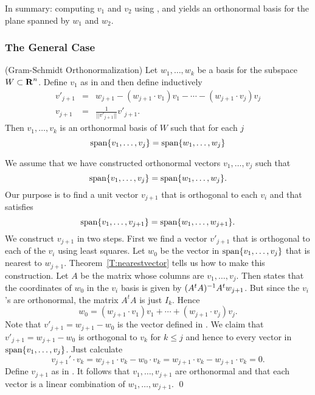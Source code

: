 In summary: computing $v_1$ and $v_2$ using , 
and  yields an orthonormal basis for the
plane spanned by $w_1$ and $w_2$.

\subsubsection*{The General Case}

\begin{thm} (Gram-Schmidt Orthonormalization) \label{T:orthobasis}
Let $w_1,\ldots,w_k$ be a basis for the subspace $W\subset\mbox{$\bf{R}$}^n$.  Define
$v_1$ as in  and then define inductively
\begin{eqnarray}
v'_{j+1} & = & w_{j+1} -(w_{j+1}\cdot v_1)v_1- \cdots -(w_{j+1}\cdot v_j)v_j
\label{E:inductiveGS} \\
v_{j+1} & = & \frac{1}{||v'_{j+1}||}v'_{j+1}. \label{eq:gsnormal}
\end{eqnarray}
Then $v_1,\ldots,v_k$ is an orthonormal basis of $W$ such that for each $j$
\[
{\rm span}\{v_1,\ldots,v_j\} = {\rm span}\{w_1,\ldots,w_j\}
\]
\end{thm}

\proof  We assume that we have constructed orthonormal vectors $v_1,\ldots,v_j$
such that
\[
{\rm span}\{v_1,\ldots,v_j\} = {\rm span}\{w_1,\ldots,w_j\}.
\]
Our purpose is to find a unit vector $v_{j+1}$ that is orthogonal to each $v_i$
and that satisfies
\[
{\rm span}\{v_1,\ldots,v_{j+1}\} = {\rm span}\{w_1,\ldots,w_{j+1}\}.
\]
We construct $v_{j+1}$ in two steps.  First we find a vector $v'_{j+1}$
that is orthogonal to each of the $v_i$ using least squares.  Let $w_0$
be the vector in ${\rm span}\{v_1,\ldots,v_j\}$ that is nearest to $w_{j+1}$.
Theorem~\ref{T:nearestvector} tells us how to make this construction.
Let $A$ be the matrix whose columns are $v_1,\ldots,v_j$.  Then
 states that the coordinates of $w_0$ in the $v_i$ basis
is given by $(A^tA)^{-1} A^tw_{j+1}$. But since the $v_i$'s are orthonormal,
the matrix $A^tA$ is just $I_k$.  Hence
\[
w_0 =  (w_{j+1}\cdot v_1)v_1 + \cdots + (w_{j+1}\cdot v_j)v_j.
\]
Note that $v'_{j+1}=w_{j+1}-w_0$ is the vector defined in .
We claim that $v'_{j+1}=w_{j+1}-w_0$ is orthogonal to $v_k$ for $k\leq j$
and hence to every vector in ${\rm span}\{v_1,\ldots,v_j\}$.  Just calculate
\[
v_{j+1}'\cdot v_k = w_{j+1}\cdot v_k - w_0\cdot v_k =
w_{j+1}\cdot v_k -  w_{j+1}\cdot v_k = 0.
\]
Define $v_{j+1}$ as in
.  It follows that $v_1,\ldots,v_{j+1}$ are orthonormal and
that each vector is a linear combination of $w_1,\ldots,w_{j+1}$.  \qed


